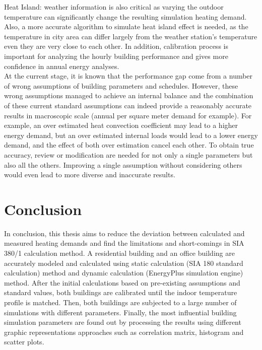 \documentclass[a4paper, oneside]{discothesis}
\begin{document}
    Heat Island: weather information is also critical as varying the outdoor temperature can significantly change the resulting simulation heating demand. Also, a more accurate algorithm to simulate heat island effect is needed, as the temperature in city area can differ largely from the weather station's temperature even they are very close to each other. In addition, calibration process is important for analyzing the hourly building performance and gives more confidence in annual energy analyses.\\
    
    At the current stage, it is known that the performance gap come from a number of wrong assumptions of building parameters and schedules. However, these wrong assumptions managed to achieve an internal balance and the combination of these current standard assumptions can indeed provide a reasonably accurate results in macroscopic scale (annual per square meter demand for example). For example, an over estimated heat convection coefficient may lead to a higher energy demand, but an over estimated internal loads would lead to a lower energy demand, and the effect of both over estimation cancel each other. To obtain true accuracy, review or modification are needed for not only a single parameters but also all the others. Improving a single assumption without considering others would even lead to more diverse and inaccurate results.\\



\chapter{Conclusion}
    In conclusion, this thesis aims to reduce the deviation between calculated and measured heating demands and find the limitations and short-comings in SIA 380/1 calculation method. A residential building and an office building are accurately modeled and calculated using static calculation (SIA 180 standard calculation) method and dynamic calculation (EnergyPlus simulation engine) method. After the initial calculations based on pre-existing assumptions and standard values, both buildings are calibrated until the indoor temperature profile is matched. Then, both buildings are subjected to a large number of simulations with different parameters. Finally, the most influential building simulation parameters are found out by processing the results using different graphic representations approaches such as correlation matrix, histogram and scatter plots. \\
\end{document}
